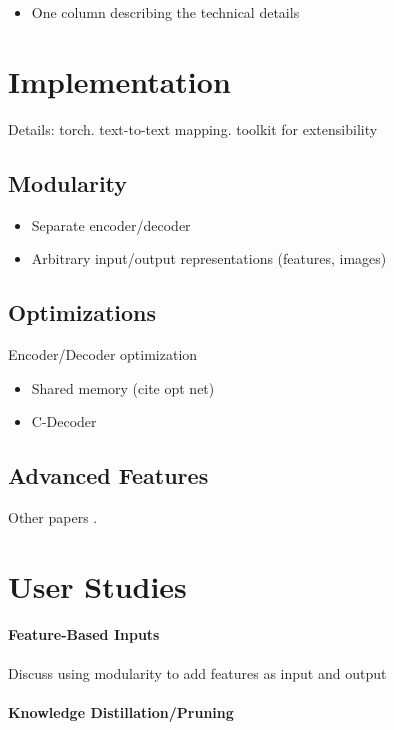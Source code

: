 \documentclass[11pt]{article}
\begin{document}
\begin{itemize}
\item One column describing the technical details
\end{itemize}

\section{Implementation}

Details: torch. text-to-text mapping. toolkit for extensibility

\subsection{Modularity}

\begin{itemize}
\item Separate encoder/decoder 
\item Arbitrary input/output representations (features, images)
\end{itemize}

\subsection{Optimizations}

Encoder/Decoder optimization

\begin{itemize}
\item Shared memory (cite opt net)
\item C-Decoder  
\end{itemize}

\subsection{Advanced Features}

Other papers . 

\section{User Studies}

\paragraph{Feature-Based Inputs}

Discuss using modularity to add features as input and output

\paragraph{Knowledge Distillation/Pruning}
\end{document}
